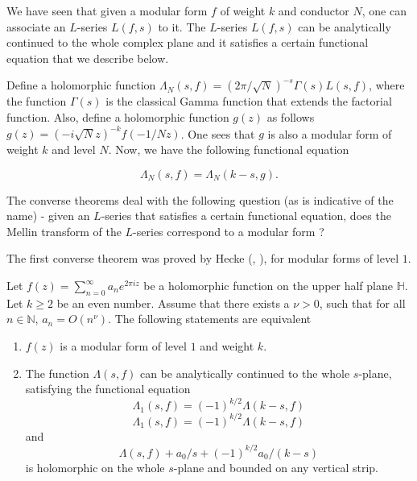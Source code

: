 \documentclass{book}
\begin{document}
We have seen that given a modular form $f$ of weight $k$ and conductor $N$, one can associate an $L$-series $L(f,s)$ to it. The $L$-series $L(f,s)$ can be analytically continued to the whole complex plane and it satisfies a certain functional equation that we describe below.

Define a holomorphic function $\Lambda_N(s,f)= (2\pi/\sqrt{N})^{-s} \Gamma(s) L(s,f)$, where the function $\Gamma(s)$ is the classical Gamma function that extends the factorial function. Also, define a holomorphic function $g(z)$ as follows $g(z)=(-i \sqrt{N} z)^{-k} f(-1/Nz)$. One sees that $g$ is also a modular form of weight $k$ and level $N$. Now, we have the following functional equation

\begin{equation}
\Lambda_N(s,f) = \Lambda_N(k-s,g).
\end{equation}

The converse theorems deal with the following question (as is indicative of the name) - given an $L$-series that satisfies a certain functional equation, does the Mellin transform of the $L$-series correspond to a modular form ?

The first converse theorem was proved by Hecke (\cite{hecke1936bestimmung}, \cite{hecke1959mathematische}), for modular forms of level $1$.

\begin{theorem} [Hecke]
Let $f(z)=\sum_{n=0}^{\infty}a_n e^{2 \pi i z}$ be a holomorphic function on the upper half plane $\mathbb{H}$. Let $k \geq 2$ be an even number. Assume that there exists a $\nu >0$, such that for all $n \in \mathbb{N}$,  $a_n =O(n^{\nu})$. The following statements are equivalent
\begin{enumerate}
\item $f(z)$ is a modular form of level $1$ and weight $k$.
\item The function $\Lambda(s,f)$ can be analytically continued to the whole $s$-plane, satisfying the functional equation
\begin{equation}
\Lambda_1(s,f)=(-1)^{k/2}\Lambda(k-s,f)
\end{equation}
\begin{equation}
\Lambda_1(s,f)=(-1)^{k/2}\Lambda(k-s,f)
\end{equation}
and
\begin{equation}
\Lambda(s,f) + a_0/s  + (-1)^{k/2}a_0/(k-s)
\end{equation}
is holomorphic on the whole $s$-plane and bounded on any vertical strip.
\end{enumerate}
\end{theorem}
\end{document}

